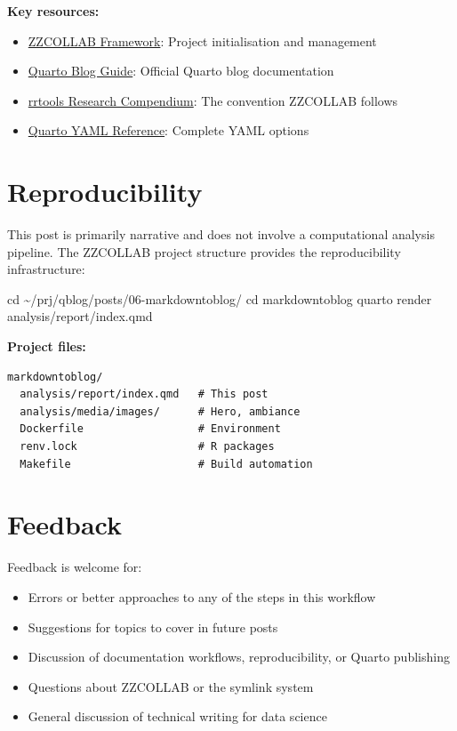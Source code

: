 \documentclass[
  letterpaper,
  DIV=11,
  numbers=noendperiod]{scrartcl}
\newenvironment{Shaded}{\begin{snugshade}}{\end{snugshade}}
\newcommand{\BuiltInTok}[1]{\textcolor[rgb]{0.00,0.23,0.31}{#1}}
\newcommand{\ExtensionTok}[1]{\textcolor[rgb]{0.00,0.23,0.31}{#1}}
\newcommand{\NormalTok}[1]{\textcolor[rgb]{0.00,0.23,0.31}{#1}}
\providecommand{\tightlist}{%
  \setlength{\itemsep}{0pt}\setlength{\parskip}{0pt}}
\begin{document}
\textbf{Key resources:}

\begin{itemize}
\tightlist
\item
  \href{https://github.com/mygit/zzcollab}{ZZCOLLAB Framework}: Project
  initialisation and management
\item
  \href{https://quarto.org/docs/websites/website-blog.html}{Quarto Blog
  Guide}: Official Quarto blog documentation
\item
  \href{https://github.com/benmarwick/rrtools}{rrtools Research
  Compendium}: The convention ZZCOLLAB follows
\item
  \href{https://quarto.org/docs/reference/formats/html.html}{Quarto YAML
  Reference}: Complete YAML options
\end{itemize}

\section{Reproducibility}\label{reproducibility}

This post is primarily narrative and does not involve a computational
analysis pipeline. The ZZCOLLAB project structure provides the
reproducibility infrastructure:

\begin{Shaded}
\begin{Highlighting}[]
\BuiltInTok{cd}\NormalTok{ \textasciitilde{}/prj/qblog/posts/06{-}markdowntoblog/}
\BuiltInTok{cd}\NormalTok{ markdowntoblog}
\ExtensionTok{quarto}\NormalTok{ render analysis/report/index.qmd}
\end{Highlighting}
\end{Shaded}

\textbf{Project files:}

\begin{verbatim}
markdowntoblog/
  analysis/report/index.qmd   # This post
  analysis/media/images/      # Hero, ambiance
  Dockerfile                  # Environment
  renv.lock                   # R packages
  Makefile                    # Build automation
\end{verbatim}

\section{Feedback}\label{feedback}

Feedback is welcome for:

\begin{itemize}
\tightlist
\item
  Errors or better approaches to any of the steps in this workflow
\item
  Suggestions for topics to cover in future posts
\item
  Discussion of documentation workflows, reproducibility, or Quarto
  publishing
\item
  Questions about ZZCOLLAB or the symlink system
\item
  General discussion of technical writing for data science
\end{itemize}
\end{document}
